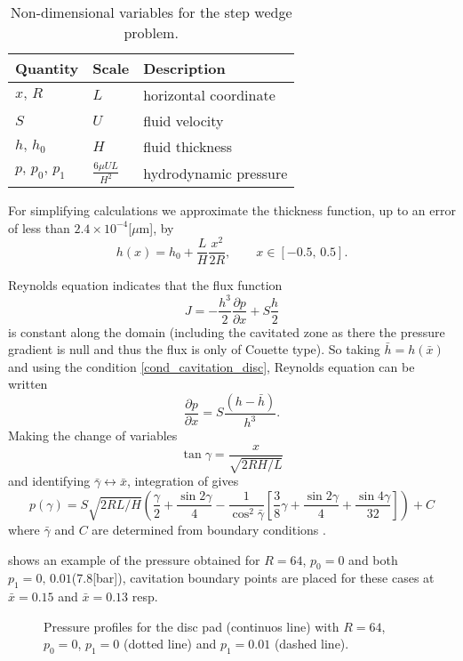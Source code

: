 \begin{table}[h]
\centering
\begin{tabular}{lll}
\toprule
Quantity & Scale & Description\\
\midrule
$x,\,R$ & $L$ & horizontal coordinate \\
$S$ & $U$ & fluid velocity \\
$h,\,h_0$ & $H$ & fluid thickness \\
$p,\,p_0,\,p_1$ & $\frac{6\mu U L}{H^2}$ & hydrodynamic pressure\\
\bottomrule
\end{tabular}
\caption{Non-dimensional variables for the step wedge problem.}\label{tab:table_non_dim_disc}
\end{table}

For simplifying calculations we approximate the thickness function, up to an error of less than $2.4\times 10^{-4}$[$\mu $m], by 
$$h(x) =h_0+\frac{L}{H}\frac{x^2}{2R},\qquad x\in [-0.5,\,0.5].$$

Reynolds equation  indicates that the flux function $$J=-\frac{h^3}{2}\frac{\partial p}{\partial x}+S\frac{h}{2}$$ is constant along the domain (including the cavitated zone as there the pressure gradient is null and thus the flux is only of Couette type). So taking $\bar{h}=h(\bar{x})$ and using the condition \eqref*{cond_cavitation_disc}, Reynolds equation can be written
\begin{equation}
\frac{\partial p}{\partial x}=S\frac{(h-\bar{h})}{h^3}.\label{eq:reynolds_disc2}
\end{equation}
Making the change of variables $$\tan{\gamma}=\frac{x}{\sqrt{2RH/L}}$$ and identifying $\bar{\gamma}\leftrightarrow \bar{x}$, integration of  gives
\begin{equation}
p(\gamma)=S\sqrt{2RL/H}\left(\frac{\gamma}{2}+\frac{\sin{2\gamma}}{4}-\frac{1}{\cos^2\bar{\gamma}}\left[\frac{3}{8}\gamma+\frac{\sin 2\gamma}{4}+\frac{\sin 4\gamma}{32}\right]\right)+C
\end{equation}
where $\bar{\gamma}$ and $C$ are determined from boundary conditions .

 shows an example of the pressure obtained for $R=64$, $p_0=0$ and both $p_1=0,\,0.01$(7.8[bar]), cavitation boundary points are placed for these cases at $\bar{x}=0.15$ and $\bar{x}=0.13$ resp.
 \begin{figure}[h!]
 \centering 
 \def\svgwidth{\textwidth}	
\caption[Pressure profiles for the disc pad with different boundary pressure conditions]{Pressure profiles for the disc pad (continuos line) with $R=64$, $p_0=0$, $p_1=0$ (dotted line) and $p_1=0.01$ (dashed line).}\label{fig:sol_disc_ex1}
\end{figure}

